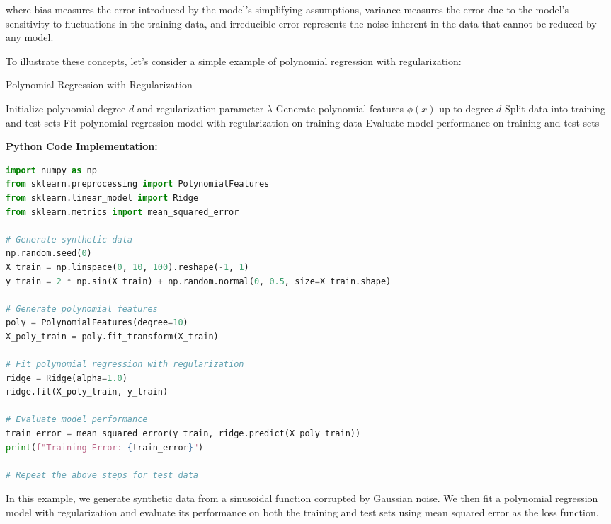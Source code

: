 \documentclass[12pt]{book} %
\begin{document}
where bias measures the error introduced by the model's simplifying assumptions, variance measures the error due to the model's sensitivity to fluctuations in the training data, and irreducible error represents the noise inherent in the data that cannot be reduced by any model.

To illustrate these concepts, let's consider a simple example of polynomial regression with regularization:
\FloatBarrier
\begin{algorithm}[H]
\caption{Polynomial Regression with Regularization}\label{alg:poly_regression}
\begin{algorithmic}[1]
\State Initialize polynomial degree \(d\) and regularization parameter \(\lambda\)
\State Generate polynomial features \(\phi(x)\) up to degree \(d\)
\State Split data into training and test sets
\State Fit polynomial regression model with regularization on training data
\State Evaluate model performance on training and test sets
\end{algorithmic}
\end{algorithm}
\FloatBarrier
\textbf{Python Code Implementation:}
\FloatBarrier
\begin{lstlisting}[language=Python, caption=Python implementation of polynomial regression with regularization]
import numpy as np
from sklearn.preprocessing import PolynomialFeatures
from sklearn.linear_model import Ridge
from sklearn.metrics import mean_squared_error

# Generate synthetic data
np.random.seed(0)
X_train = np.linspace(0, 10, 100).reshape(-1, 1)
y_train = 2 * np.sin(X_train) + np.random.normal(0, 0.5, size=X_train.shape)

# Generate polynomial features
poly = PolynomialFeatures(degree=10)
X_poly_train = poly.fit_transform(X_train)

# Fit polynomial regression with regularization
ridge = Ridge(alpha=1.0)
ridge.fit(X_poly_train, y_train)

# Evaluate model performance
train_error = mean_squared_error(y_train, ridge.predict(X_poly_train))
print(f"Training Error: {train_error}")

# Repeat the above steps for test data
\end{lstlisting}
\FloatBarrier
In this example, we generate synthetic data from a sinusoidal function corrupted by Gaussian noise. We then fit a polynomial regression model with regularization and evaluate its performance on both the training and test sets using mean squared error as the loss function.
\end{document}
